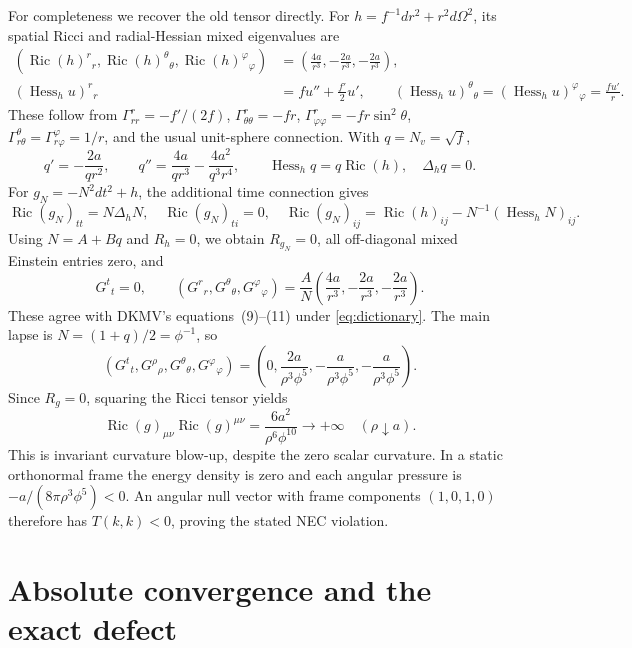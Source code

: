 \documentclass[11pt]{article}
\newcommand{\Ric}{\operatorname{Ric}}
\newcommand{\Hess}{\operatorname{Hess}}
\begin{document}
For completeness we recover the old tensor directly. For
$h=f^{-1}dr^2+r^2d\Omega^2$, its spatial Ricci and radial-Hessian mixed
eigenvalues are
\begin{align*}
 (\Ric(h)^r{}_r,\Ric(h)^\theta{}_\theta,\Ric(h)^\varphi{}_\varphi)
   &=\left(\frac{4a}{r^3},-\frac{2a}{r^3},-\frac{2a}{r^3}\right),\\
 (\Hess_h u)^r{}_r&=fu''+\frac{f'}2u',\qquad
 (\Hess_h u)^\theta{}_\theta=(\Hess_h u)^\varphi{}_\varphi=\frac{fu'}r.
\end{align*}
These follow from
$\Gamma^r_{rr}=-f'/(2f)$, $\Gamma^r_{\theta\theta}=-fr$,
$\Gamma^r_{\varphi\varphi}=-fr\sin^2\theta$,
$\Gamma^\theta_{r\theta}=\Gamma^\varphi_{r\varphi}=1/r$, and the usual
unit-sphere connection. With $q=N_v=\sqrt f$,
\[
 q'=-\frac{2a}{qr^2},\qquad
 q''=\frac{4a}{qr^3}-\frac{4a^2}{q^3r^4},
 \qquad \Hess_hq=q\Ric(h),\quad \Delta_hq=0.
\]
For $g_N=-N^2dt^2+h$, the additional time connection gives
\[
 \Ric(g_N)_{tt}=N\Delta_hN,\quad \Ric(g_N)_{ti}=0,\quad
 \Ric(g_N)_{ij}=\Ric(h)_{ij}-N^{-1}(\Hess_hN)_{ij}.
\]
Using $N=A+Bq$ and $R_h=0$, we obtain $R_{g_N}=0$, all off-diagonal
mixed Einstein entries zero, and
\begin{equation}\label{eq:familyG}
 G^t{}_t=0,\qquad
 (G^r{}_r,G^\theta{}_\theta,G^\varphi{}_\varphi)
 =\frac A N\left(\frac{4a}{r^3},-\frac{2a}{r^3},-\frac{2a}{r^3}\right).
\end{equation}
These agree with DKMV's equations~(9)--(11) under \eqref{eq:dictionary}.
The main lapse is $N=(1+q)/2=\phi^{-1}$, so
\begin{equation}\label{eq:mainG}
 (G^t{}_t,G^\rho{}_\rho,G^\theta{}_\theta,G^\varphi{}_\varphi)
 =\left(0,\frac{2a}{\rho^3\phi^5},
            -\frac{a}{\rho^3\phi^5},-\frac{a}{\rho^3\phi^5}\right).
\end{equation}
Since $R_g=0$, squaring the Ricci tensor yields
\begin{equation}\label{eq:invariant}
 \Ric(g)_{\mu\nu}\Ric(g)^{\mu\nu}
       =\frac{6a^2}{\rho^6\phi^{10}}\longrightarrow+\infty
       \quad(\rho\downarrow a).
\end{equation}
This is invariant curvature blow-up, despite the zero scalar curvature.
In a static orthonormal frame the energy density is zero and each angular
pressure is $-a/(8\pi\rho^3\phi^5)<0$. An angular null vector with frame
components $(1,0,1,0)$ therefore has $T(k,k)<0$, proving the stated NEC
violation.

\section{Absolute convergence and the exact defect}
\end{document}
